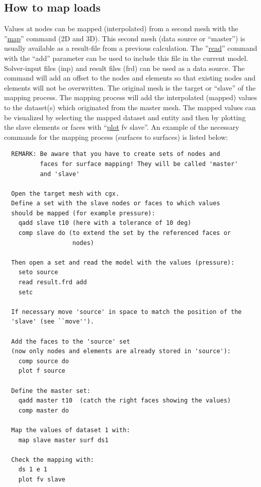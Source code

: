 \documentclass{article}
\providecommand{\htmlref}[2]{\hyperref[#2]{#1}}
\begin{document}
\begin{appendix}
\subsection{\label{How to map loads}How to map loads}
Values at nodes can be mapped (interpolated) from a second mesh with the ''\htmlref{map}{map}'' command (2D and 3D). This second mesh (data source or ``master'') is usually available as a result-file from a previous calculation. The ''\htmlref{read}{read}'' command with the ``add'' parameter can be used to include this file in the current model. Solver-input files (inp) and result files (frd) can be used as a data source. The command will add an offset to the nodes and elements so that existing nodes and elements will not be overwritten. The original mesh is the target or ``slave'' of the mapping process. The mapping process will add the interpolated (mapped) values to the dataset(s) which originated from the master mesh. The mapped values can be visualized by selecting the mapped dataset and entity and then by plotting the slave elements or faces with ``\htmlref{plot}{plot} fv slave''. An example of the necessary commands for the mapping process (surfaces to surfaces) is listed below:
\begin{verbatim}
  REMARK: Be aware that you have to create sets of nodes and
          faces for surface mapping! They will be called 'master'
          and 'slave'

  Open the target mesh with cgx.
  Define a set with the slave nodes or faces to which values
  should be mapped (for example pressure):
    qadd slave t10 (here with a tolerance of 10 deg)
    comp slave do (to extend the set by the referenced faces or
                   nodes)

  Then open a set and read the model with the values (pressure):
    seto source
    read result.frd add
    setc

  If necessary move 'source' in space to match the position of the
  'slave' (see ``move'').

  Add the faces to the 'source' set
  (now only nodes and elements are already stored in 'source'):
    comp source do
    plot f source

  Define the master set:
    qadd master t10  (catch the right faces showing the values)
    comp master do

  Map the values of dataset 1 with:
    map slave master surf ds1

  Check the mapping with:
    ds 1 e 1
    plot fv slave


\end{verbatim}
\end{appendix}
\end{document}
